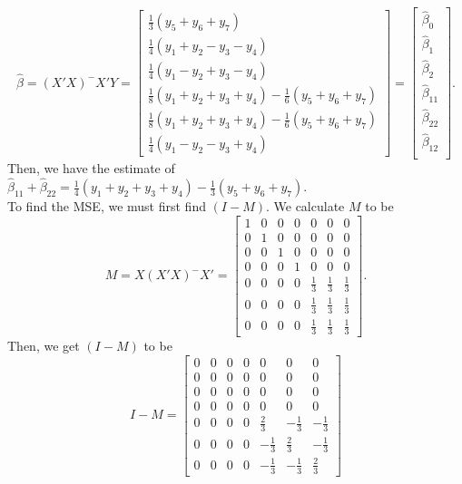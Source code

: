 \documentclass[11pt]{article}
\begin{document}
\begin{itemize}
\[
\widehat{\beta} = (X'X)^-X'Y = \begin{bmatrix}
\frac{1}{3}(y_5+y_6+y_7) \\
\frac{1}{4}(y_1+y_2-y_3-y_4) \\
\frac{1}{4}(y_1-y_2+y_3-y_4) \\
\frac{1}{8}(y_1+y_2+y_3+y_4) - \frac{1}{6}(y_5+y_6+y_7) \\
\frac{1}{8}(y_1+y_2+y_3+y_4) - \frac{1}{6}(y_5+y_6+y_7) \\
\frac{1}{4}(y_1-y_2-y_3+y_4)
\end{bmatrix} = \begin{bmatrix}
\widehat{\beta}_0 \\
\widehat{\beta}_1 \\
\widehat{\beta}_2 \\
\widehat{\beta}_{11} \\
\widehat{\beta}_{22} \\
\widehat{\beta}_{12} \\
\end{bmatrix}.
\]
Then, we have the estimate of $\widehat{\beta}_{11} + \widehat{\beta}_{22} =  \frac{1}{4}(y_1+y_2+y_3+y_4) - \frac{1}{3}(y_5+y_6+y_7)$. \\
To find the MSE, we must first find $(I-M)$.
We calculate $M$ to be
\[
M = X(X'X)^-X' = \begin{bmatrix}
1 & 0 & 0 & 0 & 0 & 0 & 0 \\
0 & 1 & 0 & 0 & 0 & 0 & 0 \\
0 & 0 & 1 & 0 & 0 & 0 & 0 \\
0 & 0 & 0 & 1 & 0 & 0 & 0 \\
0 & 0 & 0 & 0 & \frac{1}{3} & \frac{1}{3} & \frac{1}{3} \\
0 & 0 & 0 & 0 & \frac{1}{3} & \frac{1}{3} & \frac{1}{3} \\0 & 0 & 0 & 0 & \frac{1}{3} & \frac{1}{3} & \frac{1}{3}
\end{bmatrix}.
\]
Then, we get $(I-M)$ to be
\[
I-M = \begin{bmatrix}
0 & 0 & 0 & 0 & 0 & 0 & 0 \\
0 & 0 & 0 & 0 & 0 & 0 & 0 \\
0 & 0 & 0 & 0 & 0 & 0 & 0 \\
0 & 0 & 0 & 0 & 0 & 0 & 0 \\
0 & 0 & 0 & 0 & \frac{2}{3} & -\frac{1}{3} & -\frac{1}{3} \\
0 & 0 & 0 & 0 & -\frac{1}{3} & \frac{2}{3} & -\frac{1}{3} \\0 & 0 & 0 & 0 & -\frac{1}{3} & -\frac{1}{3} & \frac{2}{3}

\end{bmatrix}\]
\end{itemize}
\end{document}
